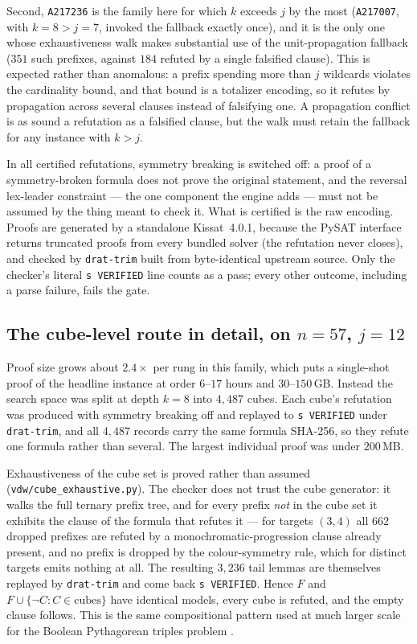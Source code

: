 \documentclass[12pt]{article}
\theoremstyle{remark}
\newcommand{\seq}[1]{\texttt{#1}}
\begin{document}
Second, \seq{A217236} is the family here for which $k$ exceeds $j$ by the most
(\seq{A217007}, with $k = 8 > j = 7$, invoked the fallback exactly once), and it is
the only one whose exhaustiveness walk makes substantial use of the unit-propagation
fallback ($351$ such prefixes, against $184$ refuted by a single falsified
clause). This is expected rather than anomalous: a prefix spending more than
$j$ wildcards violates the cardinality bound, and that bound is a totalizer
encoding, so it refutes by propagation across several clauses instead of
falsifying one. A propagation conflict is as sound a refutation as a falsified
clause, but the walk must retain the fallback for any instance with $k > j$.

In all certified refutations, symmetry breaking is switched off: a proof of
a symmetry-broken formula does not prove the original statement, and the
reversal lex-leader constraint --- the one component the engine adds --- must
not be assumed by the thing meant to check it. What is
certified is the raw encoding. Proofs are generated by a standalone
Kissat~4.0.1, because the PySAT interface returns truncated proofs from
every bundled solver (the refutation never closes), and checked by
\texttt{drat-trim} \cite{drattrim} built from byte-identical upstream
source. Only the checker's literal \texttt{s VERIFIED} line counts as a
pass; every other outcome, including a parse failure, fails the gate.

\subsection{The cube-level route in detail, on $n=57$, $j=12$}

Proof size grows about $2.4\times$ per rung in this family, which puts a
single-shot proof of the headline instance at order $6$--$17$ hours and
$30$--$150$\,GB. Instead the search space was split at depth $k=8$ into
$4{,}487$ cubes. Each cube's refutation was produced with symmetry breaking
off and replayed to \texttt{s VERIFIED} under \texttt{drat-trim}, and all
$4{,}487$ records carry the same formula SHA-256, so they refute one formula
rather than several. The largest individual proof was under $200$\,MB.

Exhaustiveness of the cube set is proved rather than assumed
(\texttt{vdw/cube\_exhaustive.py}). The checker does not trust the cube
generator: it walks the full ternary prefix tree, and for every prefix
\emph{not} in the cube set it exhibits the clause of the formula that
refutes it --- for targets $(3,4)$ all $662$ dropped prefixes are refuted by
a monochromatic-progression clause already present, and no prefix is dropped
by the colour-symmetry rule, which for distinct targets emits nothing at
all. The resulting $3{,}236$ tail lemmas are themselves replayed by
\texttt{drat-trim} and come back \texttt{s VERIFIED}. Hence $F$ and
$F \cup \{\neg C : C \in \text{cubes}\}$ have identical models, every cube
is refuted, and the empty clause follows. This is the same compositional
pattern used at much larger scale for the Boolean Pythagorean triples
problem \cite{pythagorean}.
\end{document}
